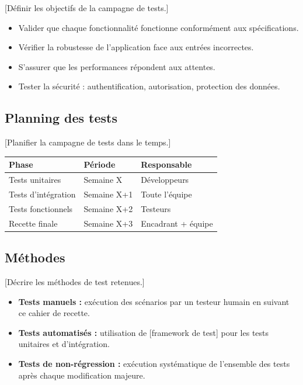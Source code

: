 \documentclass[12pt, a4paper]{article}
\begin{document}
[Définir les objectifs de la campagne de tests.]

\begin{itemize}
  \item Valider que chaque fonctionnalité fonctionne conformément aux
    spécifications.
  \item Vérifier la robustesse de l'application face aux entrées incorrectes.
  \item S'assurer que les performances répondent aux attentes.
  \item Tester la sécurité : authentification, autorisation, protection des données.
\end{itemize}

\subsection{Planning des tests}

[Planifier la campagne de tests dans le temps.]

\begin{center}
\begin{tabular}{|l|l|l|}
  \hline
  \rowcolor{tabhead}
  \color{white}\textbf{Phase} &
  \color{white}\textbf{Période} &
  \color{white}\textbf{Responsable} \\
  \hline
  Tests unitaires    & Semaine X & Développeurs \\
  \hline
  Tests d'intégration & Semaine X+1 & Toute l'équipe \\
  \hline
  Tests fonctionnels & Semaine X+2 & Testeurs \\
  \hline
  Recette finale     & Semaine X+3 & Encadrant + équipe \\
  \hline
\end{tabular}
\end{center}

\subsection{Méthodes}

[Décrire les méthodes de test retenues.]

\begin{itemize}
  \item \textbf{Tests manuels :} exécution des scénarios par un testeur humain
    en suivant ce cahier de recette.
  \item \textbf{Tests automatisés :} utilisation de [framework de test] pour
    les tests unitaires et d'intégration.
  \item \textbf{Tests de non-régression :} exécution systématique de l'ensemble
    des tests après chaque modification majeure.
\end{itemize}
\end{document}
